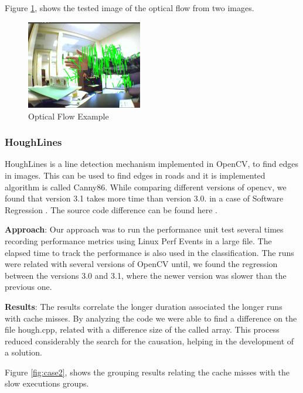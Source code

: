 Figure \ref{fig:caseOpt}, shows the tested image of the optical flow from two images. 

\begin{figure}[h]
      \centering
        \includegraphics[width=0.45\textwidth]{figures/flow.png}
        \caption{Optical Flow Example}
        \label{fig:caseOpt}
        \vspace{-5pt}
\end{figure}


\subsubsection{HoughLines} 
HoughLines is a line detection mechanism implemented in OpenCV, to find edges in images. This can be used to find edges in roads and it is implemented algorithm is called Canny86. While comparing different versions of opencv, we found that version 3.1 takes more time than version 3.0. in a case of Software Regression \cite{timeTests}. The source code difference can be found here \cite{opencv_source_diff}.

\textbf{Approach}: Our approach was to run the performance unit test several times recording performance metrics using Linux Perf Events in a large file. The elapsed time to track the performance is also used in the classification. The runs were related with several versions of OpenCV until, we found the regression between the versions 3.0 and 3.1, where the newer version was slower than the previous one.


\textbf{Results}: The results correlate the longer duration associated the longer runs with cache misses. By analyzing the code we were able to find a difference on the file hough.cpp, related with a difference size of the called array. This process reduced considerably the search for the causation, helping in the development of a solution.
    
    Figure \ref{fig:case2}, shows the grouping results relating the cache misses with the slow executions groups.
    
